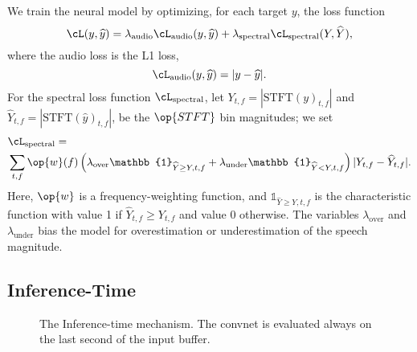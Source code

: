 \documentclass[english]{article}
\begin{document}
We train the neural model by optimizing, for each target $y$, the loss function
$$\cL(y, \widehat{y}) = \lambda_{\text{audio}}\cL_{\text{audio}}(y, \widehat{y}) + \lambda_{\text{spectral}}\cL_{\text{spectral}}(Y, \widehat{Y}),$$
where the audio loss is the L1 loss,
$$ \cL_{\text{audio}}(y, \widehat{y}) = |y - \widehat{y}|.$$ 
For the spectral loss function $\cL_{\text{spectral}}$, let $Y_{t, f} = |\text{STFT}(y)_{t, f}|$ and $\widehat{Y}_{t, f} = |\text{STFT}(\widehat{y})_{t, f}|$, be the $\op{STFT}$ bin magnitudes; we set
\begin{equation*}
\begin{aligned}
 & \cL_{\text{spectral}}  = \\ 
 & \sum_{t, f}\op{w}(f)\left(\lambda_{\text{over}}\mathbb{1}_{\widehat{Y} \geq Y, t, f} + \lambda_{\text{under}}\mathbb{1}_{\widehat{Y} < Y, t, f} \right)|Y_{t, f} - \widehat{Y}_{t, f}|. 
\end{aligned}
\end{equation*}
Here, $\op{w}$ is a frequency-weighting function, and $\mathbb{1}_{\widehat{Y} \geq Y, t, f}$ is the characteristic function with value 1 if $\widehat{Y}_{t, f} \geq Y_{t, f}$ and value 0 otherwise. The variables $\lambda_{\text{over}}$ and $\lambda_{\text{under}}$ bias the model for overestimation or underestimation of the speech magnitude. 


\subsection{Inference-Time} 

\begin{figure}[htb!]
    \caption{The Inference-time mechanism. The convnet is evaluated always on the last second of the input buffer. }
\label{figinference}
\end{figure}
\end{document}
